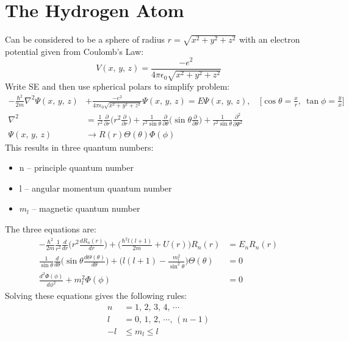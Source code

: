 \documentclass[a4paper, 11pt, normalem]{report}
\begin{document}
\section{The Hydrogen Atom}
Can be considered to be a sphere of radius $r = \sqrt{x^2 + y^2 + z^2}$ with an electron potential given from Coulomb's Law:
\begin{equation}
    V(x,\,y,\,z) = \frac{-e^{2}}{4\pi\epsilon_{0}\sqrt{x^2 + y^2 + z^2}}
\end{equation}
Write SE and then use spherical polars to simplify problem:
\begin{align}
    -\frac{\hbar^{2}}{2m}\nabla^{2}\Psi(x,\,y,\,z) &+ \frac{-e^{2}}{4\pi\epsilon_{0}\sqrt{x^2 + y^2 + z^2}}\Psi(x,\,y,\,z) = E\Psi(x,\,y,\,z),\quad \bigg[\cos\theta = \frac{x}{r},~\tan\phi = \frac{y}{x}\bigg] \\
    \nabla^{2} &= \frac{1}{r^{2}}\frac{\partial}{\partial r}\Big(r^{2}\frac{\partial}{\partial r}\Big) + \frac{1}{r^{2}\sin\theta}\frac{\partial}{\partial\theta} \Big(\sin\theta \frac{\partial}{\partial\theta}\Big) + \frac{1}{r^{2}\sin\theta}\frac{\partial^{2}}{\partial \Psi^{2}} \\
    \Psi(x,\,y,\,z) &\rightarrow R(r)\Theta(\theta)\Phi(\phi)
\end{align}
This results in three quantum numbers:
\begin{itemize}
    \item n -- principle quantum number
    \item l -- angular momentum quantum number
    \item $m_{l}$ -- magnetic quantum number
\end{itemize}
The three equations are:
\begin{align}
    -\frac{\hbar^{2}}{2m}\frac{1}{r^{2}}\frac{d}{dr}\bigg(r^{2}\frac{dR_{n}(r)}{dr}\bigg) + \bigg(\frac{\hbar^{2}l(l + 1)}{2m} + U(r)\bigg)R_{n}(r) &= E_{n}R_{n}(r) \\
    \frac{1}{\sin\theta}\frac{d}{d\theta}\bigg(\sin\theta \frac{d\Theta(\theta)}{d\theta}\bigg) + \bigg(l(l + 1) - \frac{m_{l}^{2}}{\sin^{2}\theta}\bigg)\Theta(\theta) &= 0 \\
    \frac{d^{2}\Phi(\phi)}{d\phi^{2}} + m_{l}^{2}\Phi(\phi) &= 0
\end{align}
Solving these equations gives the following rules:
\begin{align}
    n &= 1,\,2,\,3,\,4,\, \cdots \\
    l &= 0,\,1,\,2,\, \cdots ,\,(n - 1) \\
    -l &\leq m_{l} \leq l
\end{align}
\end{document}
